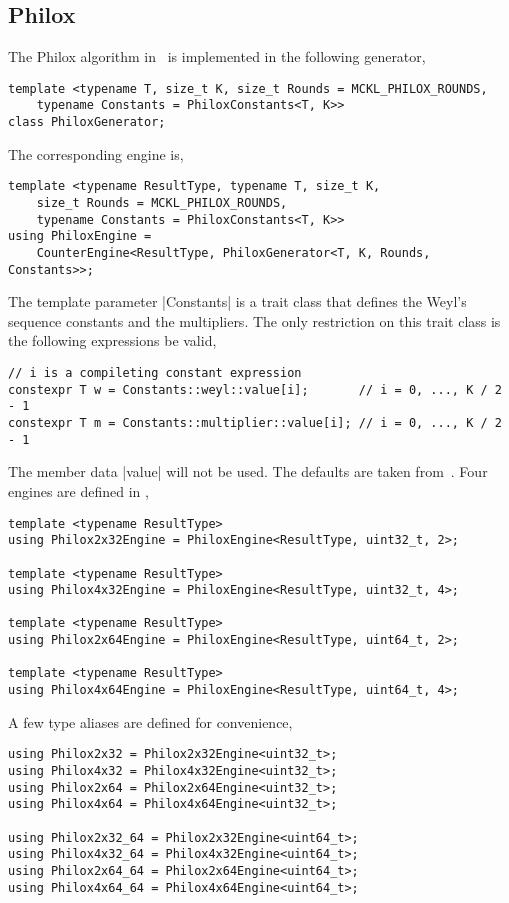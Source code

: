 \subsection{Philox}
\label{sub:Philox}

The Philox algorithm in~\cite{Salmon:2011um} is implemented in the following
generator,
\begin{verbatim}
template <typename T, size_t K, size_t Rounds = MCKL_PHILOX_ROUNDS,
    typename Constants = PhiloxConstants<T, K>>
class PhiloxGenerator;
\end{verbatim}
The corresponding \rng engine is,
\begin{verbatim}
template <typename ResultType, typename T, size_t K,
    size_t Rounds = MCKL_PHILOX_ROUNDS,
    typename Constants = PhiloxConstants<T, K>>
using PhiloxEngine =
    CounterEngine<ResultType, PhiloxGenerator<T, K, Rounds, Constants>>;
\end{verbatim}
The template parameter |Constants| is a trait class that defines the Weyl's
sequence constants and the multipliers. The only restriction on this trait
class is the following expressions be valid,
\begin{verbatim}
// i is a compileting constant expression
constexpr T w = Constants::weyl::value[i];       // i = 0, ..., K / 2 - 1
constexpr T m = Constants::multiplier::value[i]; // i = 0, ..., K / 2 - 1
\end{verbatim}
The member data |value| will not be \odr used. The defaults are taken
from~\cite{Salmon:2011um}. Four engines are defined in \mckl,
\begin{verbatim}
template <typename ResultType>
using Philox2x32Engine = PhiloxEngine<ResultType, uint32_t, 2>;

template <typename ResultType>
using Philox4x32Engine = PhiloxEngine<ResultType, uint32_t, 4>;

template <typename ResultType>
using Philox2x64Engine = PhiloxEngine<ResultType, uint64_t, 2>;

template <typename ResultType>
using Philox4x64Engine = PhiloxEngine<ResultType, uint64_t, 4>;
\end{verbatim}
A few type aliases are defined for convenience,
\begin{verbatim}
using Philox2x32 = Philox2x32Engine<uint32_t>;
using Philox4x32 = Philox4x32Engine<uint32_t>;
using Philox2x64 = Philox2x64Engine<uint32_t>;
using Philox4x64 = Philox4x64Engine<uint32_t>;

using Philox2x32_64 = Philox2x32Engine<uint64_t>;
using Philox4x32_64 = Philox4x32Engine<uint64_t>;
using Philox2x64_64 = Philox2x64Engine<uint64_t>;
using Philox4x64_64 = Philox4x64Engine<uint64_t>;
\end{verbatim}

